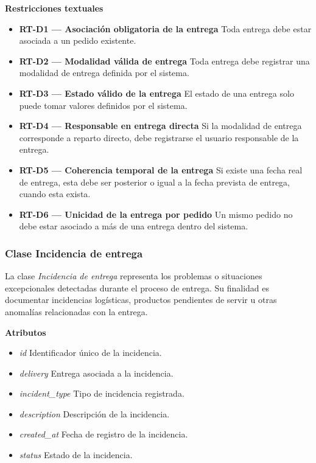 \textbf{Restricciones textuales}

\begin{itemize}
      \item \textbf{RT-D1 — Asociación obligatoria de la entrega}
            Toda entrega debe estar asociada a un pedido existente.
      \item \textbf{RT-D2 — Modalidad válida de entrega}
            Toda entrega debe registrar una modalidad de entrega definida por el sistema.
      \item \textbf{RT-D3 — Estado válido de la entrega}
            El estado de una entrega solo puede tomar valores definidos por el sistema.
      \item \textbf{RT-D4 — Responsable en entrega directa}
            Si la modalidad de entrega corresponde a reparto directo, debe registrarse el usuario responsable de la entrega.
      \item \textbf{RT-D5 — Coherencia temporal de la entrega}
            Si existe una fecha real de entrega, esta debe ser posterior o igual a la fecha prevista de entrega, cuando esta exista.
      \item \textbf{RT-D6 — Unicidad de la entrega por pedido}
            Un mismo pedido no debe estar asociado a más de una entrega dentro del sistema.
\end{itemize}

\subsubsection{Clase Incidencia de entrega}

La clase \textit{Incidencia de entrega} representa los problemas o situaciones excepcionales detectadas durante el proceso de entrega. Su finalidad es documentar incidencias logísticas, productos pendientes de servir u otras anomalías relacionadas con la entrega.

\textbf{Atributos}

\begin{itemize}
      \item \textit{id}
            Identificador único de la incidencia.
      \item \textit{delivery}
            Entrega asociada a la incidencia.
      \item \textit{incident\_type}
            Tipo de incidencia registrada.
      \item \textit{description}
            Descripción de la incidencia.
      \item \textit{created\_at}
            Fecha de registro de la incidencia.
      \item \textit{status}
            Estado de la incidencia.
\end{itemize}

